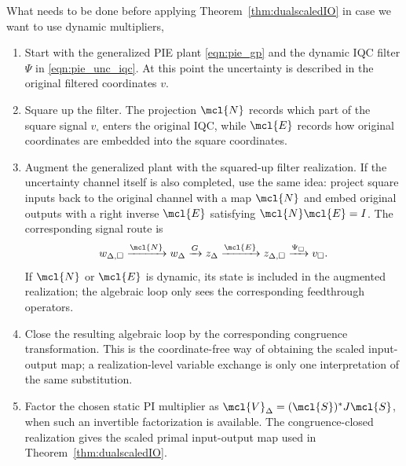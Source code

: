 What needs to be done before applying Theorem~\ref{thm:dualscaledIO} in case we want to use dynamic multipliers,
\begin{enumerate}
    \item Start with the generalized PIE plant \eqref{eqn:pie_gp} and the dynamic IQC
    filter $\Psi$ in \eqref{eqn:pie_unc_iqc}. At this point the uncertainty is
    described in the original filtered coordinates $v$.

    \item Square up the filter. The projection $\mcl{N}$
    records which part of the square signal $v_\square$ enters the original IQC,
    while $\mcl{E}$ records how original coordinates are embedded into the
    square coordinates.

    \item Augment the generalized plant with the squared-up filter realization.
    If the uncertainty channel itself is also completed, use the same idea:
    project square inputs back to the original channel with a map $\mcl{N}$ and
    embed original outputs with a right inverse $\mcl{E}$ satisfying
    $\mcl{N}\mcl{E}=I$. The corresponding signal route is
    \[
        w_{\Delta,\square}
        \xrightarrow{\mcl{N}}
        w_{\Delta}
        \xrightarrow{G}
        z_{\Delta}
        \xrightarrow{\mcl{E}}
        z_{\Delta,\square}
        \xrightarrow{\Psi_\square}
        v_\square .
    \]
    If $\mcl{N}$ or $\mcl{E}$ is dynamic, its state is included in the augmented
    realization; the algebraic loop only sees the corresponding feedthrough
    operators.

    \item Close the resulting algebraic loop by the corresponding congruence
    transformation. This is the coordinate-free way of obtaining the scaled
    input-output map; a realization-level variable exchange is only one
    interpretation of the same substitution.

    \item Factor the chosen static PI multiplier as
    $\mcl{V}_\Delta=(\mcl{S})^*J\mcl{S}$, when such an
    invertible factorization is available. The congruence-closed realization
    gives the scaled primal input-output map used in
    Theorem~\ref{thm:dualscaledIO}.
\end{enumerate}

